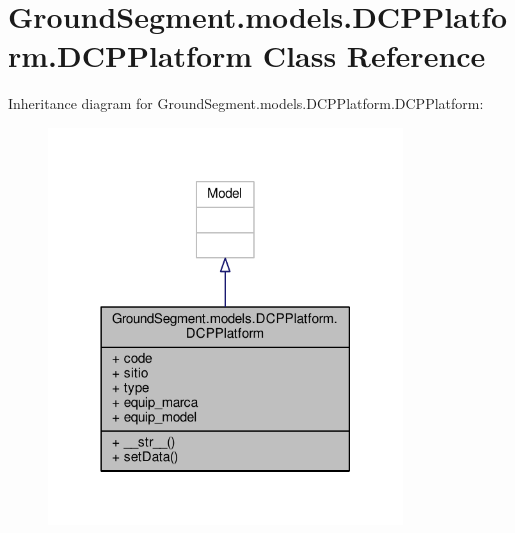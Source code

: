 \hypertarget{class_ground_segment_1_1models_1_1_d_c_p_platform_1_1_d_c_p_platform}{}\section{Ground\+Segment.\+models.\+D\+C\+P\+Platform.\+D\+C\+P\+Platform Class Reference}
\label{class_ground_segment_1_1models_1_1_d_c_p_platform_1_1_d_c_p_platform}


Inheritance diagram for Ground\+Segment.\+models.\+D\+C\+P\+Platform.\+D\+C\+P\+Platform\+:\nopagebreak
\begin{figure}[H]
\begin{center}
\leavevmode
\includegraphics[width=266pt]{class_ground_segment_1_1models_1_1_d_c_p_platform_1_1_d_c_p_platform__inherit__graph}
\end{center}
\end{figure}


